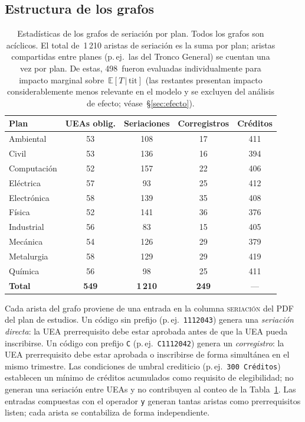 \documentclass[11pt,letterpaper]{article}
\newcommand{\ETtit}{\mathbb{E}[T\,|\,\mathrm{tit}]}
\begin{document}
\subsection{Estructura de los grafos}

\begin{table}[H]\centering
\caption{Estadísticas de los grafos de seriación por plan.
         Todos los grafos son acíclicos.
         El total de~1\,210 aristas de seriación es la suma por plan; aristas
         compartidas entre planes (p.\,ej.\ las del Tronco General) se cuentan
         una vez por plan.
         De estas, 498~fueron evaluadas individualmente para impacto marginal
         sobre~$\ETtit$ (las restantes presentan impacto considerablemente menos relevante en el modelo
         y se excluyen del análisis de efecto; véase~\S\ref{sec:efecto}).}
\label{tab:grafos}
\small
\begin{tabular}{lcccc}
\toprule
Plan & UEAs oblig. & Seriaciones & Corregistros & Créditos \\
\midrule
Ambiental    & 53 & 108 & 17 & 411 \\
Civil        & 53 & 136 & 16 & 394 \\
Computación  & 52 & 157 & 22 & 406 \\
Eléctrica    & 57 &  93 & 25 & 412 \\
Electrónica  & 58 & 139 & 35 & 408 \\
Física       & 52 & 141 & 36 & 376 \\
Industrial   & 56 &  83 & 15 & 405 \\
Mecánica     & 54 & 126 & 29 & 379 \\
Metalurgia   & 58 & 129 & 29 & 419 \\
Química      & 56 &  98 & 25 & 411 \\
\midrule
\textbf{Total} & \textbf{549} & \textbf{1\,210} & \textbf{249} & --- \\
\bottomrule
\end{tabular}
\end{table}

Cada arista del grafo proviene de una entrada en la columna \textsc{seriación} del PDF del plan de estudios.
Un código sin prefijo (p.\,ej.\ \texttt{1112043}) genera una \emph{seriación directa}: la UEA prerrequisito debe estar aprobada antes de que la UEA pueda inscribirse.
Un código con prefijo \texttt{C} (p.\,ej.\ \texttt{C1112042}) genera un \emph{corregistro}: la UEA prerrequisito debe estar aprobada o inscribirse de forma simultánea en el mismo trimestre.
Las condiciones de umbral crediticio (p.\,ej.\ \texttt{300 Créditos}) establecen un mínimo de créditos acumulados como requisito de elegibilidad; no generan una seriación entre UEAs y no contribuyen al conteo de la Tabla~\ref{tab:grafos}.
Las entradas compuestas con el operador \texttt{y} generan tantas aristas como prerrequisitos listen; cada arista se contabiliza de forma independiente.
\end{document}

